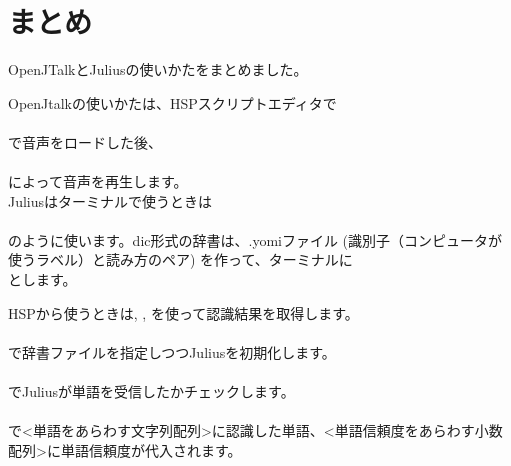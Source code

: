 \section{まとめ}
OpenJTalkとJuliusの使いかたをまとめました。

OpenJtalkの使いかたは、HSPスクリプトエディタで\\
\\
で音声をロードした後、\\
\\
によって音声を再生します。\\

Juliusはターミナルで使うときは\\
\\
のように使います。dic形式の辞書は、.yomiファイル (識別子（コンピュータが使うラベル）と読み方のペア) を作って、ターミナルに\\
とします。

HSPから使うときは, ,  を使って認識結果を取得します。\\
\\
で辞書ファイルを指定しつつJuliusを初期化します。\\
\\
でJuliusが単語を受信したかチェックします。\\
\\
で<単語をあらわす文字列配列>に認識した単語、<単語信頼度をあらわす小数配列>に単語信頼度が代入されます。